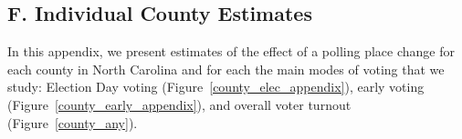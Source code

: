 \documentclass{cup_PSRM}
\begin{document}
\clearpage \newpage
\subsection{F. Individual County Estimates}\label{appendix_county}
\setcounter{table}{0}
\setcounter{figure}{0}
\renewcommand{\thetable}{F\arabic{table}}
\renewcommand{\thefigure}{F\arabic{figure}}


\noindent In this appendix, we present estimates of the effect of a polling place change for each county in North Carolina and for each the main modes of voting that we study:  Election Day voting (Figure~\ref{county_elec_appendix}), early voting (Figure~\ref{county_early_appendix}), and overall voter turnout (Figure~\ref{county_any}).
\end{document}
